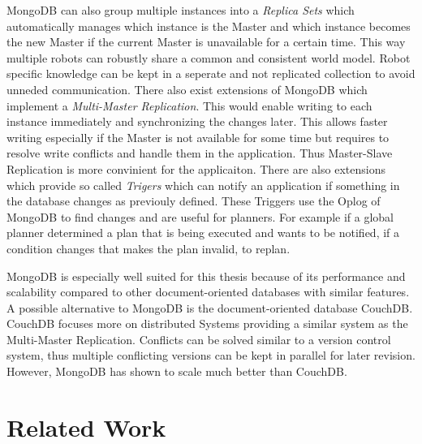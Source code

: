 \documentclass[a4paper,11pt]{article}
\begin{document}
 MongoDB can also group multiple
instances into a \emph{Replica Sets} which automatically manages which
instance is the Master and which instance becomes the new Master if
the current Master is unavailable for a certain time. This way
multiple robots can robustly share a common and consistent world
model. Robot specific knowledge can be kept in a seperate and not
replicated collection to avoid unneded communication. There also exist
extensions of MongoDB which implement a \emph{Multi-Master
  Replication}. This would enable writing to each instance immediately
and synchronizing the changes later.  This allows faster
writing especially if the Master is not available for some time but
requires to resolve write conflicts and handle them in the
application. Thus Master-Slave Replication is more convinient for the
applicaiton.
%
There are also extensions which provide so called \emph{Trigers} which
can notify an application if something in the database changes as
previouly defined.  These Triggers use the Oplog of
MongoDB to find changes and are useful for planners. For example if a
global planner determined a plan that is being executed and wants to
be notified, if a condition changes that makes the plan invalid, to
replan.

MongoDB is especially well suited for this thesis because of its
performance and scalability compared to other document-oriented
databases with similar features. A possible alternative to MongoDB is
the document-oriented database CouchDB. CouchDB
focuses more on distributed Systems providing a similar system as the
Multi-Master Replication. Conflicts can be solved similar to a version
control system, thus multiple conflicting versions can be kept in
parallel for later revision. However, MongoDB has shown to scale much better than CouchDB.


\section{Related Work}
\label{sec:related}
\end{document}
